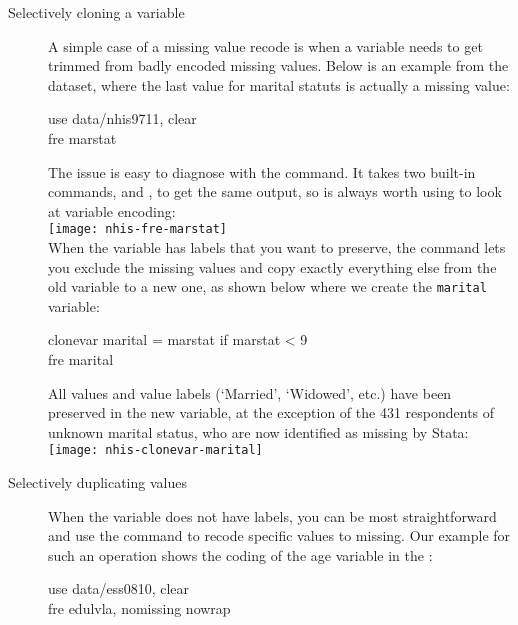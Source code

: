 \begin{description}
	\item[Selectively cloning a variable]%
	A simple case of a missing value recode is when a variable needs to get trimmed from badly encoded missing values. Below is an example from the \NHIS dataset, where the last value for marital statuts is actually a missing value:

	\begin{docspec}
		use data/nhis9711, clear\\
		fre marstat
	\end{docspec}

	The issue is easy to diagnose with the  command. It takes two built-in commands,  and , to get the same output, so  is always worth using to look at variable encoding:\\[1em]

	\texttt{[image: nhis-fre-marstat]}\\[1em]

	When the variable has labels that you want to preserve, the  command lets you exclude the missing values and copy exactly everything else from the old variable to a new one, as shown below where we create the \texttt{marital} variable:

	\begin{docspec}
		clonevar marital = marstat if marstat < 9\\
		fre marital
	\end{docspec}

	All values and value labels (`Married', `Widowed', etc.) have been preserved in the new variable, at the exception of the 431 respondents of unknown marital status, who are now identified as missing by Stata:\\[1em]

	\texttt{[image: nhis-clonevar-marital]}\\[1em]

	\item[Selectively duplicating values]%
	When the variable does not have labels, you can be most straightforward and use the  command to recode specific values to missing. Our example for such an operation shows the coding of the age variable in the \wvs:

	\begin{docspec}
		use data/ess0810, clear\\
		fre edulvla, nomissing nowrap
	\end{docspec}
	

\end{description}
